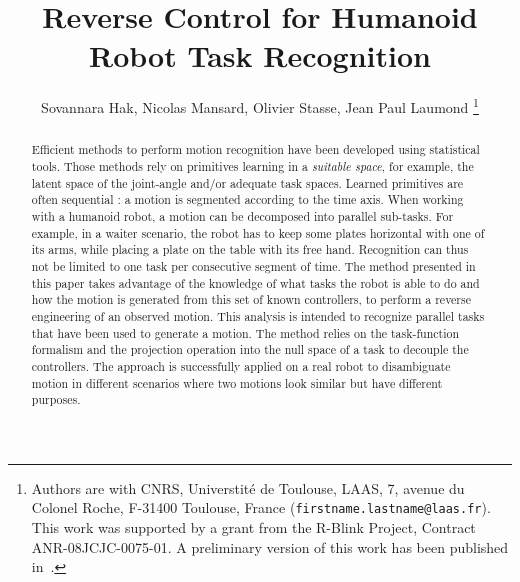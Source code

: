 \documentclass[journal]{IEEEtran}
\begin{document}
\title{\LARGE Reverse Control for Humanoid Robot Task Recognition}

\author{Sovannara Hak, Nicolas Mansard, Olivier Stasse, Jean Paul Laumond%
  \thanks{Authors are with CNRS, Universtit\'e de Toulouse, LAAS, 7, avenue du Colonel Roche, F-31400 Toulouse, France ({\tt\small firstname.lastname@laas.fr}).
This work was supported by a grant from the R-Blink Project, Contract
  ANR-08JCJC-0075-01. A preliminary version of this work has been published in~\cite{hak10}.  }
  }

\maketitle


\begin{abstract}
Efficient methods to perform motion recognition have been developed
using statistical tools. Those methods rely on primitives learning
in a \emph{suitable space}, for example, the latent space of the joint-angle and/or adequate task spaces.
Learned primitives are often sequential : a motion is segmented according to the time axis.
When working with a humanoid robot, a motion can be decomposed into
parallel sub-tasks. For example, in a waiter scenario,
the robot has to keep some plates horizontal with one of its arms, while placing a plate
on the table with its free hand.
Recognition can thus not be limited to one task per consecutive segment of
time.
The method presented in this paper
takes advantage of the knowledge of what tasks the robot is able to do and how
the motion is generated from this set of known controllers, to perform a reverse engineering of an
observed motion. This analysis is intended to recognize parallel tasks that
have been used to generate a motion. The method relies
on the task-function formalism and the projection operation into the null space of a task to decouple
the controllers.
The approach is successfully applied on a real robot
to disambiguate motion in different scenarios where two motions look similar but have
different purposes.
\end{abstract}
\end{document}
